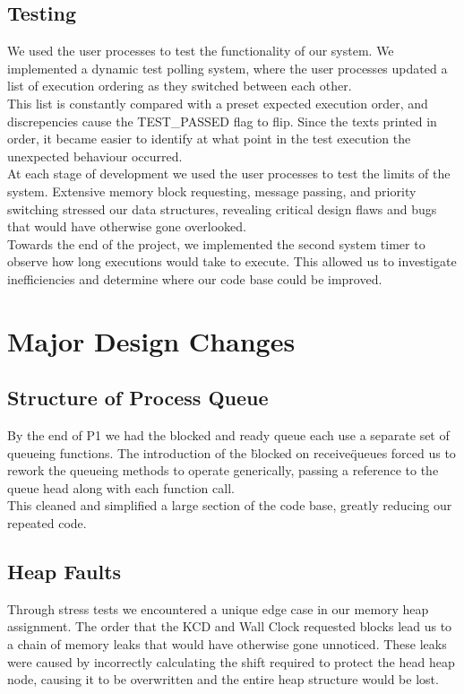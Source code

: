 \documentclass[12pt]{report}
\begin{document}
\section{Testing}

We used the user processes to test the functionality of our system. We implemented a dynamic test polling system, where the user processes updated a list of execution ordering as they switched between each other.\\

This list is constantly compared with a preset expected execution order, and discrepencies cause the TEST_PASSED flag to flip. Since the texts printed in order, it became easier to identify at what point in the test execution the unexpected behaviour occurred.\\

At each stage of development we used the user processes to test the limits of the system. Extensive memory block requesting, message passing, and priority switching stressed our data structures, revealing critical design flaws and bugs that would have otherwise gone overlooked. \\

Towards the end of the project, we implemented the second system timer to observe how long executions would take to execute. This allowed us to investigate inefficiencies and determine where our code base could be improved.\\

\chapter{Major Design Changes}


\section{Structure of Process Queue}

By the end of P1 we had the blocked and ready queue each use a separate set of queueing functions. The introduction of the \"blocked on receive\" queues forced us to rework the queueing methods to operate generically, passing a reference to the queue head along with each function call.\\
This cleaned and simplified a large section of the code base, greatly reducing our repeated code.\\

\section{Heap Faults}
Through stress tests we encountered a unique edge case in our memory heap assignment. The order that the KCD and Wall Clock requested blocks lead us to a chain of memory leaks that would have otherwise gone unnoticed. These leaks were caused by incorrectly calculating the shift required to protect the head heap node, causing it to be overwritten and the entire heap structure would be lost.
\end{document}
